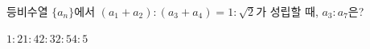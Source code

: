등비수열 $\{a_n\}$에서 $(a_1+a_2):(a_3+a_4)=1:\sqrt{2}$가 성립할 때, $a_3:a_7$은?
\begin{choices32}{$1:2$}{$1:4$}{$2:3$}{$2:5$}{$4:5$}\end{choices32}
